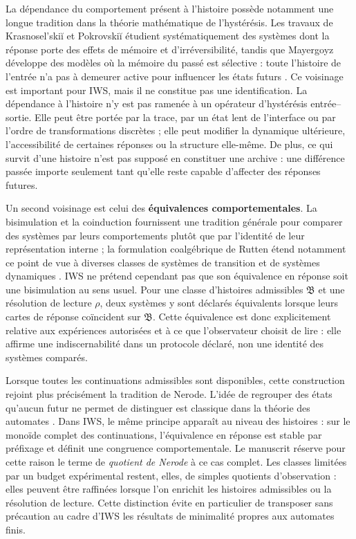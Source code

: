 \documentclass[
  11pt,
  a4paper,
  openany]{book}
\theoremstyle{definition}
\begin{document}
La dépendance du comportement présent à l’histoire possède notamment une longue tradition dans la théorie mathématique de l’hystérésis. Les travaux de Krasnosel’skiĭ et Pokrovskiĭ étudient systématiquement des systèmes dont la réponse porte des effets de mémoire et d’irréversibilité, tandis que Mayergoyz développe des modèles où la mémoire du passé est sélective : toute l’histoire de l’entrée n’a pas à demeurer active pour influencer les états futurs \cite{krasnoselskii1989systems,mayergoyz1991mathematical}. Ce voisinage est important pour IWS, mais il ne constitue pas une identification. La dépendance à l’histoire n’y est pas ramenée à un opérateur d’hystérésis entrée–sortie. Elle peut être portée par la trace, par un état lent de l’interface ou par l’ordre de transformations discrètes ; elle peut modifier la dynamique ultérieure, l’accessibilité de certaines réponses ou la structure elle-même. De plus, ce qui survit d’une histoire n’est pas supposé en constituer une archive : une différence passée importe seulement tant qu’elle reste capable d’affecter des réponses futures. 

Un second voisinage est celui des \textbf{équivalences comportementales}. La bisimulation et la coinduction fournissent une tradition générale pour comparer des systèmes par leurs comportements plutôt que par l’identité de leur représentation interne ; la formulation coalgébrique de Rutten étend notamment ce point de vue à diverses classes de systèmes de transition et de systèmes dynamiques \cite{rutten2000universal,sangiorgi2011bisimulation}. IWS ne prétend cependant pas que son équivalence en réponse soit une bisimulation au sens usuel. Pour une classe d’histoires admissibles \(\mathfrak B\) et une résolution de lecture \(\rho\), deux systèmes y sont déclarés équivalents lorsque leurs cartes de réponse coïncident sur \(\mathfrak B\). Cette équivalence est donc explicitement relative aux expériences autorisées et à ce que l’observateur choisit de lire : elle affirme une indiscernabilité dans un protocole déclaré, non une identité des systèmes comparés. 

Lorsque toutes les continuations admissibles sont disponibles, cette construction rejoint plus précisément la tradition de Nerode. L’idée de regrouper des états qu’aucun futur ne permet de distinguer est classique dans la théorie des automates \cite{nerode1958linear}. Dans IWS, le même principe apparaît au niveau des histoires : sur le monoïde complet des continuations, l’équivalence en réponse est stable par préfixage et définit une congruence comportementale. Le manuscrit réserve pour cette raison le terme de \textit{quotient de Nerode} à ce cas complet. Les classes limitées par un budget expérimental restent, elles, de simples quotients d’observation : elles peuvent être raffinées lorsque l’on enrichit les histoires admissibles ou la résolution de lecture.  Cette distinction évite en particulier de transposer sans précaution au cadre d’IWS les résultats de minimalité propres aux automates finis.
\end{document}
